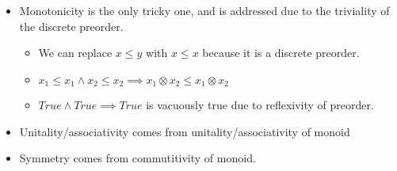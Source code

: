 \begin{itemize}
    \item Monotonicity is the only tricky one, and is addressed due to the triviality of the discrete preorder.
          \begin{itemize}
            \item We can replace $x \leq y$ with $x \leq x$ because it is a discrete preorder.
            \item $x_1 \leq x_1 \land x_2 \leq x_2 \implies x_1 \otimes x_2 \leq x_1 \otimes x_2$
            \item $True \land True \implies True$ is vacuously true due to reflexivity of preorder.
          \end{itemize}
    \item Unitality/associativity comes from unitality/associativity of monoid
    \item Symmetry comes from commutitivity of monoid.

  \end{itemize}
